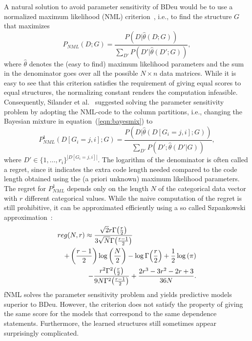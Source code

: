 \documentclass[letterpaper]{article}
\begin{document}
A natural solution to avoid parameter sensitivity of BDeu would be to
use a normalized maximum likelihood (NML)
criterion~\cite{Shta87,Riss96a}, i.e., to find the structure $G$ that
maximizes
\begin{equation}
P_{NML}(D;G)=\frac{P(D|\hat\theta(D;G))}{\sum_{D'}{P(D'|\hat\theta(D';G))}},
\end{equation}
where $\hat\theta$ denotes the (easy to find) maximum likelihood
parameters and the sum in the denominator goes over all the possible
$N\times n$ data matrices. While it is easy to see that this criterion
satisfies the requirement of giving equal scores to equal structures,
the normalizing constant renders the computation
infeasible. Consequently, Silander et al.~\cite{cosco.pgm08a}
suggested solving the parameter sensitivity problem by adopting the
NML-code to the column partitions, i.e., changing the Bayesian mixture
in equation~(\ref{eqn:bayesmix}) to
\begin{equation}
P^1_{NML}(D[G_i=j,i];G)=\frac{P(D|\hat\theta(D[G_i=j,i];G))}{\sum_{D'}{P(D';\hat\theta(D'|G))}},
\end{equation}
where $D'\in{\{1,\ldots,r_i\}}^{|D[G_i=j,i]|}$.  The logarithm of the
denominator is often called a regret, since it indicates the extra
code length needed compared to the code length obtained using the (a
priori unknown) maximum likelihood parameters. The regret for
$P^1_{NML}$ depends only on the length $N$ of the categorical data
vector with $r$ different categorical values.  While the naive
computation of the regret is still prohibitive, it can be approximated
efficiently using a so called Szpankowski
approximation~\cite{cosco.aistat03}:
\begin{eqnarray}
\label{eqn:szp}
\lefteqn{reg(N,r) \approx \frac{\sqrt{2} r \Gamma{\left(\frac{r}{2} \right)}}
                               {3 \sqrt{N} \Gamma{\left(\frac{r-1}{2}  \right)}}} \\
&&+ \left(\frac{r-1}{2}\right) \log{\left (\frac{N}{2} \right )}
- \log \Gamma{\left(\frac{r}{2} \right)} + \frac{1}{2} \log{\left (\pi \right )}\nonumber\\
&&- \frac{r^{2} \Gamma^{2}{\left(\frac{r }{2} \right)}}
         {9N \Gamma^{2}{\left(\frac{r-1}{2}\right)}}
+ \frac{2r^3-3r^2-2r+3}{36N}\nonumber.
\end{eqnarray}
fNML solves the parameter sensitivity problem and yields predictive
models superior to BDeu.  However, the criterion does not satisfy the
property of giving the same score for the models that correspond to
the same dependence statements. Furthermore, the learned structures
still sometimes appear surprisingly complicated.
 
\end{document}
